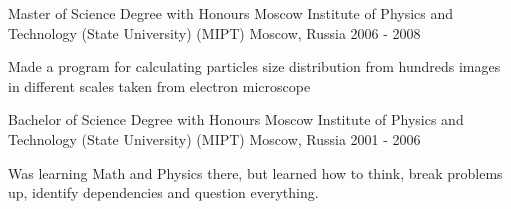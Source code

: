 

\begin{cventries}

  \cventry
    {Master of Science Degree with Honours} %
    {Moscow Institute of Physics and Technology (State University) (MIPT)} %
    {Moscow, Russia} %
    {2006 - 2008} %
    {
      \begin{cvitems} %
        \item {Made a program for calculating particles size distribution from hundreds images in different scales taken from electron microscope}
      \end{cvitems}
    }

  \cventry
    {Bachelor of Science Degree with Honours} %
    {Moscow Institute of Physics and Technology (State University) (MIPT)} %
    {Moscow, Russia} %
    {2001 - 2006} %
    {
      \begin{cvitems} %
        \item {Was learning Math and Physics there, but learned how to think, break problems up, identify dependencies and question everything.}
      \end{cvitems}
    }

\end{cventries}
